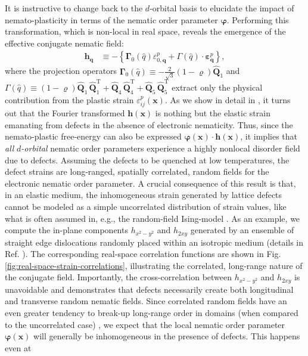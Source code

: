 \documentclass[aps,prb, twocolumn, superscriptaddress, amsmath, amsfonts, amssymb, amsthm]{revtex4-2}
\begin{document}
It is instructive to change back to the $d$-orbital basis to elucidate the impact of nemato-plasticity in terms of the nematic order parameter $\boldsymbol{\varphi}$. Performing this transformation, which is non-local in real space, reveals the emergence of the effective conjugate nematic field:
\begin{equation}
    \begin{aligned}
        \boldsymbol{h}_{\boldsymbol{q}} &\equiv -\left\{\boldsymbol{\Gamma}_0(\hat{q})\varepsilon_{0,\boldsymbol{q}}^p + \Gamma(\hat{q}) \cdot \boldsymbol{\varepsilon}^p_{\boldsymbol{q}}\right\},
    \end{aligned}
\end{equation}
where the projection operators $\boldsymbol{\Gamma}_0(\hat{q}) \equiv -\frac{2}{\sqrt{3}}(1-\varrho)\boldsymbol{\hat{Q}}_1$ and $\Gamma(\hat{q}) \equiv (1-\varrho)\boldsymbol{\hat{Q}}_1^{\phantom{\text{T}}}\boldsymbol{\hat{Q}}_1^{\text{T}} + \boldsymbol{\hat{Q}}_4^{\phantom{\text{T}}}\boldsymbol{\hat{Q}}_4^{\text{T}} + \boldsymbol{\hat{Q}}_5^{\phantom{\text{T}}}\boldsymbol{\hat{Q}}_5^{\text{T}}$ extract only the physical contribution from the plastic strain $\varepsilon^p_{ij}(\boldsymbol{x})$. As we show in detail in \citep{LongPaper}, it turns out that the Fourier transformed $\boldsymbol{h}(\boldsymbol{x})$  is nothing but the elastic strain emanating from defects in the absence of electronic nematicity. Thus, since the nemato-plastic free-energy can also be expressed $\boldsymbol{\varphi}(\boldsymbol{x})\cdot \boldsymbol{h}(\boldsymbol{x})$, it implies that \textit{all} \textit{$d$-orbital} nematic order parameters experience a highly nonlocal disorder field due to defects. Assuming the defects to be quenched at low temperatures, the defect strains are long-ranged, spatially correlated, random fields for the electronic nematic order parameter. A crucial consequence of this result is that, in an elastic medium, the inhomogeneous strain generated by lattice defects cannot be modeled as a simple uncorrelated distribution of strain values, like what is often assumed in, e.g., the random-field Ising-model \cite{Carlson2006, nieQuenchedDisorderVestigial2014, vojtaPhasesPhaseTransitions2013, vojtaDisorderQuantumManyBody2019}. As an example, we compute the in-plane components $h_{x^2-y^2}$ and $h_{2xy}$  generated by an ensemble of straight edge dislocations randomly placed within an isotropic medium (details in Ref. \citep{LongPaper}). The corresponding real-space correlation functions are shown in Fig. \ref{fig:real-space-strain-correlations}, illustrating the correlated, long-range nature of the conjugate field. Importantly, the cross-correlation between $h_{x^2-y^2}$ and $h_{2xy}$ is unavoidable and demonstrates that defects necessarily create both longitudinal and transverse random nematic fields. Since correlated random fields have an even greater tendency to break-up long-range order in domains (when compared to the uncorrelated case) \citep{weinribCriticalPhenomenaSystems1983, nattermannInstabilitiesIsingSystems1983, vojtaPhasesPhaseTransitions2013, vojtaDisorderQuantumManyBody2019}, we expect that the local nematic order parameter $\boldsymbol{\varphi}(\boldsymbol{x})$ will generally be inhomogeneous in the presence of defects. This happens even at 
\end{document}
